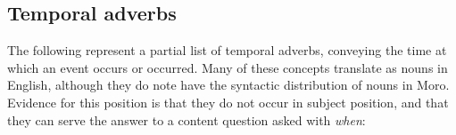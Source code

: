 
\subsection{Temporal adverbs}\label{sec:ch13:temporal}

The following represent a partial list of temporal adverbs, conveying the time at which an event occurs or occurred. Many of these concepts translate as nouns in English, although they do note have the syntactic distribution of nouns in Moro. Evidence for this position is that they do not occur in subject position, and that they can serve the answer to a content question asked with \textit{when}:


